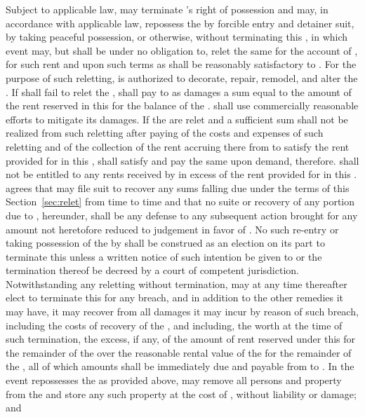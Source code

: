 \label{sec:relet}
Subject to applicable law, \lessor may terminate \lessee's right of possession and may, in accordance with applicable law, repossess the \premises by forcible entry and detainer suit, by taking peaceful possession, or otherwise, without terminating this \lease, in which event \lessor may, but shall be under no obligation to, relet the same for the account of \lessee, for such rent and upon such terms as shall be reasonably satisfactory to \lessor. For the purpose of such reletting, \lessor is authorized to decorate, repair, remodel, and alter the \premises. If \lessor shall fail to relet the \premises, \lessee shall pay to \lessor as damages a sum equal to the amount of the rent reserved in this \lease for the balance of the \termOfLease. \lessor shall use commercially reasonable efforts to mitigate its damages. If the \premises are relet and a sufficient sum shall not be realized from such reletting after paying of the costs and expenses of such reletting and of the collection of the rent accruing there from to satisfy the rent provided for in this \lease, \lessee shall satisfy and pay the same upon demand, therefore. \lessee shall not be entitled to any rents received by \lessor in excess of the rent provided for in this \lease. \lessee agrees that \lessor may file suit to recover any sums falling due under the terms of this Section~\ref{sec:relet} from time to time and that no suite or recovery of any portion due to \lessor, hereunder, shall be any defense to any subsequent action brought for any amount not heretofore reduced to judgement in favor of \lessor. No such re-entry or taking possession of the \premises by \lessor shall be construed as an election on its part to terminate this \lease unless a written notice of such intention be given to \lessee or the termination thereof be decreed by a court of competent jurisdiction. Notwithstanding any reletting without termination, \lessor may at any time thereafter elect to terminate this \lease for any breach, and in addition to the other remedies it may have, it may recover from \lessee all damages it may incur by reason of such breach, including the costs of recovery of the \premises, and including, the worth at the time of such termination,  the excess, if any, of the amount of rent reserved under this \lease for the remainder of the \termOfLease over the reasonable rental value of the \premises for the remainder of the \termOfLease, all of which amounts shall be immediately due and payable from \lessee to \lessor. In the event \lessor repossesses the \premises as provided above, \lessor may remove all persons and property from the \premises and store any such property at the cost of \lessee, without liability or damage; and
